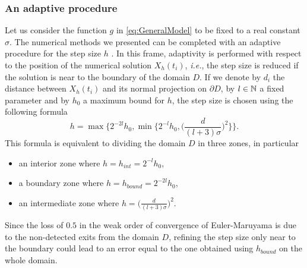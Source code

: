 \subsubsection{An adaptive procedure}\label{sec:Adapt}

Let us consider the function $g$ in \eqref{eq:GeneralModel} to be fixed to a real constant $\sigma$. The numerical methods we presented can be completed with an adaptive procedure for the step size $h$ \cite{Giles2016}. In this frame, adaptivity is performed with respect to the position of the numerical solution $X_h(t_i)$, \textit{i.e.}, the step size is reduced if the solution is near to the boundary of the domain $D$. If we denote by $d_i$ the distance between $X_h(t_i)$ and its normal projection on $\partial D$, by $l \in \mathbb{N}$ a fixed parameter and by $h_0$ a maximum bound for $h$, the step size is chosen using the following formula
\begin{equation}\label{eq:Adaptivity}
	h = \max\Big\{ 2^{-2l}h_0, \min\Big\{ 2^{-l}h_0, \Big(\frac{d}{(l + 3)\sigma}\Big)^2\Big\}\Big\}.
\end{equation}
This formula is equivalent to dividing the domain $D$ in three zones, in particular
\begin{itemize}
	\item an interior zone where $h = h_{int} = 2^{-l}h_0$,
	\item a boundary zone where $h = h_{bound} = 2^{-2l}h_0$,
	\item an intermediate zone where $h = \Big(\frac{d}{(l + 3)\sigma}\Big)^2$.
\end{itemize}
Since the loss of $0.5$ in the weak order of convergence of Euler-Maruyama is due to the non-detected exits from the domain $D$, refining the step size only near to the boundary could lead to an error equal to the one obtained using $h_{bound}$ on the whole domain.

